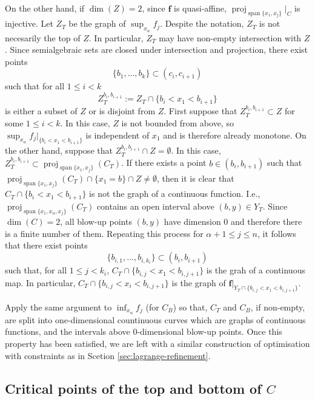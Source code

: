 \documentclass[
]{book}
\theoremstyle{definition}
\theoremstyle{definition}
\theoremstyle{definition}
\theoremstyle{definition}
\theoremstyle{remark}
\begin{document}
On the other hand, if \(\dim(Z) = 2\), since \(\mathbf{f}\) is quasi-affine, \({\operatorname{proj}_{{\operatorname{span} \{x_1,x_j\}}}}\vert_C\) is injective.
Let \(Z_T\) be the graph of \(\sup_{x_\alpha} f_j\). Despite the notation, \(Z_T\) is not necesarily the top of \(Z\). In particular, \(Z_T\) may have non-empty intersection with \(Z\).
Since semialgebraic sets are closed under intersection and projection, there exist points
\[\{b_1,\ldots,b_k\} \subset (c_i,c_{i+1})
\] such that for all \(1 \le i < k\) \[
Z^{b_i,b_{i+1}}_T := Z_T \cap \{ b_i < x_1 < b_{i+1} \}
\]
is either a subset of \(Z\) or is disjoint from \(Z\).
First suppose that \(Z^{b_i,b_{i+1}}_T \subset Z\) for some \(1 \le i < k\).
In this case, \(Z\) is not bounded from above, so \(\sup_{x_\alpha} f_j \vert_{\{ b_i < x_1 < b_{i+1} \}}\) is independent of \(x_1\) and is therefore already monotone.
On the other hand, suppose that \(Z^{b_i,b_{i+1}}_T \cap Z = \emptyset\).
In this case, \(Z^{b_i,b_{i+1}}_T \subset {\operatorname{proj}_{{\operatorname{span} \{x_1,x_j\}}}}(C_T)\).
If there exists a point \(b \in (b_i,b_{i+1})\) such that \({\operatorname{proj}_{{\operatorname{span} \{x_1,x_j\}}}}(C_T) \cap \{x_1 = b\} \cap Z \neq \emptyset\),
then it is clear that \(C_T \cap \{ b_i < x_1 < b_{i+1} \}\) is not the graph of a continuous function.
I.e., \({\operatorname{proj}_{{\operatorname{span} \{x_1,x_\alpha,x_j\}}}}(C_T)\) contains an open interval above \((b,y) \in Y_T\).
Since \(\dim(C) = 2\), all blow-up points \((b,y)\) have dimension \(0\) and therefore there is a finite number of them. Repeating this process for \(\alpha + 1 \le j \le n\), it follows that there exist points
\[\{ b_{i,1}, \ldots, b_{i,k_i} \} \subset (b_i, b_{i+1})
\] such that, for all \(1 \le j < k_i\), \(C_T \cap \{ b_{i,j} < x_1 < b_{i,j+1} \}\) is the grah of a continuous map.
In particular, \(C_T \cap \{ b_{i,j} < x_i < b_{i,j+1} \}\) is the graph of \(\mathbf{f}\vert_{Y_T \cap \{ b_{i,j} < x_1 < b_{i,j+1} \}}\).

Apply the same argument to \(\inf_{x_\alpha} f_j\) (for \(C_B\)) so that, \(C_T\) and \(C_B\), if non-empty, are split into one-dimensional countinuous curves which are graphs of continuous functions, and the intervals above \(0\)-dimensional blow-up points. Once this property has been satisfied, we are left with a similar construction of optimisation with constraints as in Scetion \ref{sec:lagrange-refinement}.

\hypertarget{critical-points-of-the-top-and-bottom-of-c}{%
\subsection{\texorpdfstring{Critical points of the top and bottom of \(C\)}{Critical points of the top and bottom of C}}\label{critical-points-of-the-top-and-bottom-of-c}}
\end{document}
